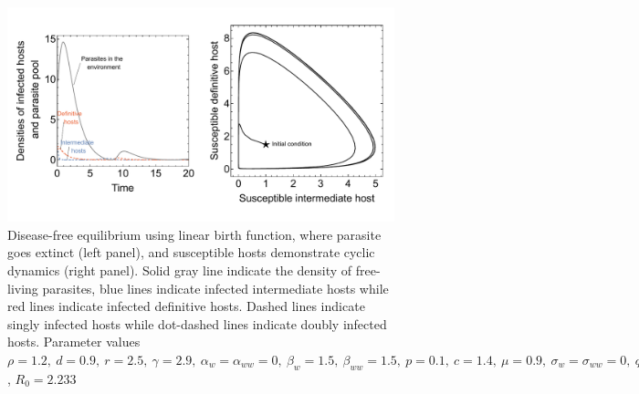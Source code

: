 \documentclass[11pt]{article}
\begin{document}
\begin{figure}[!ht]
\includegraphics[width=\textwidth]{Figures/diseasefree_linear.pdf}
\caption{Disease-free equilibrium using linear birth function, where parasite goes extinct (left panel), and susceptible hosts demonstrate cyclic dynamics (right panel). Solid gray line indicate the density of free-living parasites, blue lines indicate infected intermediate hosts while red lines indicate infected definitive hosts. Dashed lines indicate singly infected hosts while dot-dashed lines indicate doubly infected hosts. Parameter values  $\rho = 1.2, \  d = 0.9, \  r = 2.5, \ \gamma = 2.9, \ \alpha_w =  \alpha_{ww} =  0, \ \beta_w  = 1.5, \ \beta_{ww} = 1.5, \ p = 0.1,  \ c = 1.4, \ \mu = 0.9,  \ \sigma_w = \sigma_{ww} = 0, \ q = 0.01, \  f_w = 6.5, \  f_{ww} = 7.5, \ \delta = 0.9$, $R_0 = 2.233$ } 
\label{fig:diseasefree:linear}
\end{figure}
\end{document}
